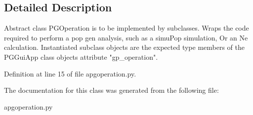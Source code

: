 \subsection{Detailed Description}
\begin{DoxyVerb}Abstract class PGOperation is to be implemented by subclasses.
Wraps the code required to perform a pop gen analysis, such as a simuPop simulation,
Or an Ne calculation.  Instantiated subclass objects are the expected type members 
of the PGGuiApp class objects attribute "gp_operation".
\end{DoxyVerb}
 

Definition at line 15 of file apgoperation.\+py.



The documentation for this class was generated from the following file\+:\begin{DoxyCompactItemize}
\item 
apgoperation.\+py\end{DoxyCompactItemize}
